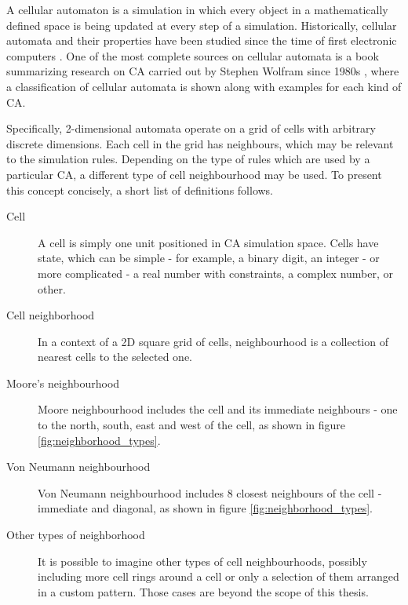 \documentclass[12pt]{report}
\begin{document}
A cellular automaton is a simulation in which every object in a mathematically defined space is being updated at every step of a simulation. Historically, cellular automata and their properties have been studied since the time of first electronic computers \autocite{Sarkar:2000:BHC:349194.349202}. One of the most complete sources on cellular automata is a book summarizing research on CA carried out by Stephen Wolfram since 1980s \autocite{wolfram2002new}, where a classification of cellular automata is shown along with examples for each kind of CA. 

Specifically, 2-dimensional automata operate on a grid of cells with arbitrary discrete dimensions. Each cell in the grid has neighbours, which may be relevant to the simulation rules. Depending on the type of rules which are used by a particular CA, a different type of cell neighbourhood may be used. To present this concept concisely, a short list of definitions follows.

\begin{description}
	\item[Cell] A cell is simply one unit positioned in CA simulation space. Cells have state, which can be simple  - for example, a binary digit, an integer - or more complicated - a real number with constraints, a complex number, or other.  
	\item[Cell neighborhood] In a context of a 2D square grid of cells, neighbourhood is a collection of nearest cells to the selected one.
	\item[Moore's neighbourhood]  Moore neighbourhood includes the cell and its immediate neighbours - one to the north, south, east and west of the cell, as shown in figure \ref{fig:neighborhood_types}.
	\item[Von Neumann neighbourhood] Von Neumann neighbourhood includes 8 closest neighbours of the cell - immediate and diagonal, as shown in figure \ref{fig:neighborhood_types}.
	\item[Other types of neighborhood] It is possible to imagine other types of cell neighbourhoods, possibly including more cell rings around a cell or only a selection of them arranged in a custom pattern. Those cases are beyond the scope of this thesis.
\end{description}
 
\end{document}
